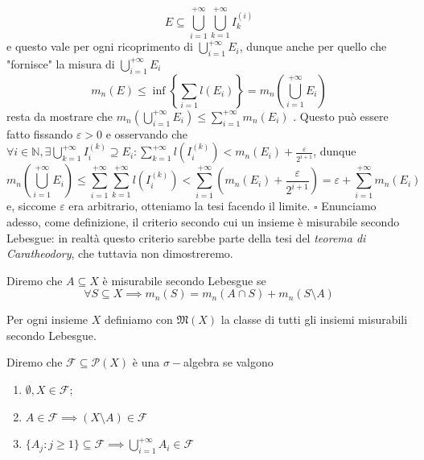 	$$
		E \subseteq \bigcup_{i=1}^{+\infty} \bigcup_{k=1}^{+\infty} I_k^{(i)}
	$$
	e questo vale per ogni ricoprimento di $\bigcup\limits_{i=1}^{+\infty} E_i$, dunque anche per quello che "fornisce" la misura di $\bigcup\limits_{i=1}^{+\infty} E_i$
	$$
		m_n(E) \leq \inf \left\{\sum_{i=1} l(E_i) \right\} = m_n \left( \bigcup_{i=1}^{+\infty} E_i \right)
	$$
	resta da mostrare che $m_n( \bigcup\limits_{i=1}^{+\infty} E_i ) \leq \sum\limits_{i=1}^{+\infty} m_n(E_i)$ . Questo può essere fatto fissando $\varepsilon > 0$ e osservando che $\forall i \in \mathbb{N}, \exists \bigcup\limits_{k=1}^{+\infty} I_{i}^{(k)} \supseteq E_i : \sum\limits_{k=1}^{+\infty} l(I_i^{(k)}) < m_n(E_i) + \frac{\varepsilon}{2^{i+1}}$, dunque
	$$
	m_n \left( \bigcup_{i=1}^{+\infty} E_i \right) \leq \sum_{i=1}^{+\infty} \sum_{k=1}^{+\infty} l(I_{i}^{(k)}) < \sum_{i=1}^{+\infty} (m_n(E_i) + \frac{\varepsilon}{2^{i+1}}) = \varepsilon + \sum_{i=1}^{+\infty} m_n(E_i)
	$$
	e, siccome $\varepsilon$ era arbitrario, otteniamo la tesi facendo il limite.
\hfill $\square$
%
Enunciamo adesso, come definizione, il criterio secondo cui un insieme è misurabile secondo Lebesgue: in realtà questo criterio sarebbe parte della tesi del \emph{teorema di Caratheodory}, che tuttavia non dimostreremo.
%
\vspace{0.5cm}
\begin{definition}[\textcolor{blue}{insieme misurabile secondo Lebesgue}]
	Diremo che $A \subseteq X$ è misurabile secondo Lebesgue se
	$$
	\forall S \subseteq X \implies m_n(S) = m_n(A \cap S) + m_n(S \setminus A)
	$$
	\label{def:mis_lebesgue}
\end{definition}
%
Per ogni insieme $X$ definiamo con $\mathfrak{M}(X)$ la classe di tutti gli insiemi misurabili secondo Lebesgue.
%
\vspace{0.5cm}
\begin{definition}[\textcolor{blue}{$\sigma-$algebra}]
	Diremo che $\mathcal{F} \subseteq \mathcal{P}(X)$ è una $\sigma-$algebra se valgono
	\begin{enumerate}[label=\protect\circled{\arabic*}]
		\item $\emptyset, X \in \mathcal{F}$;
		\item $A \in \mathcal{F} \implies (X \setminus A) \in \mathcal{F}$
		\item $\{ A_j : j \geq 1 \} \subseteq \mathcal{F} \implies \bigcup\limits_{i=1}^{+\infty} A_i \in \mathcal{F}$
	\end{enumerate}
\end{definition}
%
\vspace{0.5cm}

